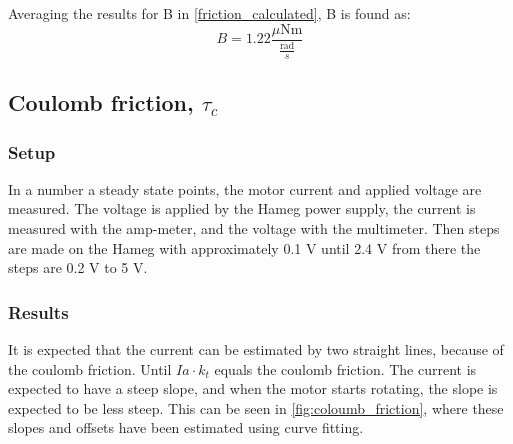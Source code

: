 \begin{table}[H]
\centering
{}
\caption{The friction torque and friction coefficient B.}
\label{friction_calculated}
\end{table}
\vspace{-5mm}
Averaging the results for B in \autoref{friction_calculated}, B is found as:
$$B=1.22 \frac{\mu\text{Nm}}{\frac{\text{rad}}{s}}$$


\subsection{Coulomb friction, $\tau_c$} \label{app:coloumbTest}
\subsubsection{Setup}
In a number a steady state points, the motor current and applied voltage are measured. The voltage is applied by the Hameg power supply, the current is measured with the amp-meter, and the voltage with the multimeter. Then steps are made on the Hameg with approximately 0.1 V until 2.4 V from there the steps are 0.2 V to 5 V.  

\subsubsection{Results}
It is expected that the current can be estimated by two straight lines, because of the coulomb friction. Until $Ia \cdot k_t$ equals the coulomb friction. The current is expected to have a steep slope, and when the motor starts rotating, the slope is expected to be less steep. This can be seen in \autoref{fig:coloumb_friction}, where these slopes and offsets have been estimated using curve fitting. 

